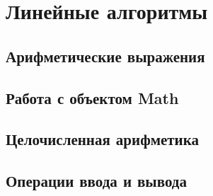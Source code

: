 \section{Линейные алгоритмы}

\subsection{Арифметические выражения}

\subsection{Работа с объектом Math}

\subsection{Целочисленная арифметика}

\subsection{Операции ввода и вывода}
